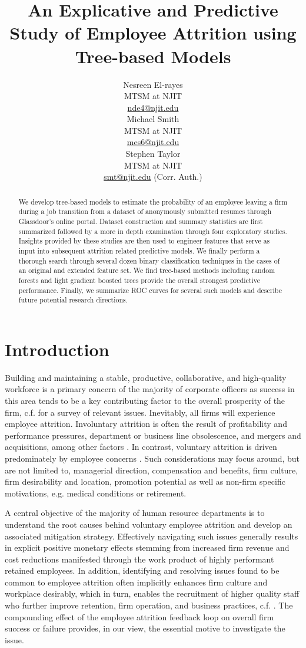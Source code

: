 \documentclass[10pt]{article}
\title{An Explicative and Predictive Study of Employee Attrition using Tree-based Models}
\author{Nesreen El-rayes\\
  MTSM at NJIT \\
  {\underline{nde4@njit.edu}} \\\And
  Michael Smith\\
  MTSM at NJIT \\
  {\underline{mes6@njit.edu}}\\\And 
  Stephen Taylor\\
  MTSM at NJIT \\
  {\underline{smt@njit.edu} (Corr. Auth.)} \\}
\date{}
\begin{document}
\maketitle
\begin{abstract}
We develop tree-based models to estimate the probability of an employee leaving a 
firm during a job transition from a dataset of anonymously submitted resumes 
through Glassdoor's online portal.  Dataset  construction and summary 
statistics are first summarized followed by a more in depth examination  
through four exploratory studies.  Insights provided by these studies are then 
used to engineer features that serve as input into subsequent attrition related 
predictive models.  We finally perform a thorough search through several dozen binary 
classification techniques in the cases of an original and extended feature set.  
We find tree-based methods including random forests and light gradient boosted trees 
provide the overall strongest predictive performance.  Finally, we summarize ROC curves 
for several such models and describe future potential research directions. 
\end{abstract}

\section{Introduction}
Building and maintaining a stable, productive, collaborative, and high-quality workforce is a primary concern 
of the majority of corporate officers as success in this area tends to be a key contributing factor to the 
overall prosperity of the firm, c.f. \cite{Mir1993} for a survey of relevant issues.
Inevitably, all firms will experience employee attrition.  
Involuntary attrition is often the result of profitability and performance pressures, department or business 
line obsolescence, and mergers and acquisitions, among other factors \cite{Datta2009,Grip2006,SHAU1998}.  In contrast,
voluntary attrition is driven predominately by employee concerns \cite{Singh2012}.  Such considerations 
may focus around, but are not limited to, managerial direction, compensation and benefits, firm culture, 
firm desirability and location, promotion potential as well as non-firm specific motivations, e.g. medical 
conditions or retirement. 
  
A central objective of the majority of human resource departments is to understand the root causes 
behind voluntary employee attrition and develop an associated mitigation strategy.  Effectively 
navigating such issues generally results in explicit positive monetary effects stemming from increased 
firm revenue and cost reductions manifested through the work product of highly performant retained employees. 
In addition, identifying and resolving issues found to be common to employee attrition often implicitly 
enhances firm culture and workplace desirably, which in turn, enables the recruitment of higher quality 
staff who further improve retention, firm operation, and business practices, c.f.  \cite{Cook1986,Free1994}.  
The compounding effect of the employee attrition feedback loop on overall firm
success or failure provides, in our view, the essential motive to 
investigate the issue. 
\end{document}
